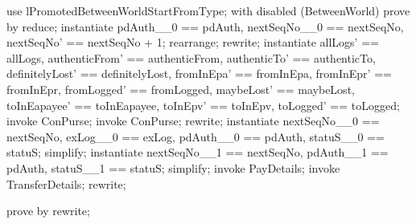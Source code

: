 \begin{LPScript}\begin{zproof}[tBetwStartFromOkayPRE]
    use lPromotedBetweenWorldStartFromType;
    with disabled (BetweenWorld) prove by reduce;
    instantiate pdAuth\_\_0 == pdAuth, nextSeqNo\_\_0 == nextSeqNo,
        nextSeqNo' == nextSeqNo + 1;
    rearrange;
    rewrite;
    instantiate allLogs' == allLogs, authenticFrom' == authenticFrom,
        authenticTo' == authenticTo, definitelyLost' == definitelyLost,
        fromInEpa' == fromInEpa, fromInEpr' == fromInEpr,
        fromLogged' == fromLogged, maybeLost' == maybeLost,
        toInEapayee' == toInEapayee, toInEpv' == toInEpv,
        toLogged' == toLogged;
    invoke \Delta ConPurse;
    invoke ConPurse;
    rewrite;
    instantiate nextSeqNo\_\_0 == nextSeqNo, exLog\_\_0 == exLog,
        pdAuth\_\_0 == pdAuth, statuS\_\_0 == statuS;
    simplify;
    instantiate nextSeqNo\_\_1 == nextSeqNo, pdAuth\_\_1 == pdAuth,
        statuS\_\_1 == statuS;
    simplify;
    invoke PayDetails;
    invoke TransferDetails;
    rewrite;
\end{zproof}\end{LPScript}

\begin{LDCheck}\begin{zproof}
    prove by rewrite;
\end{zproof}\end{LDCheck}

